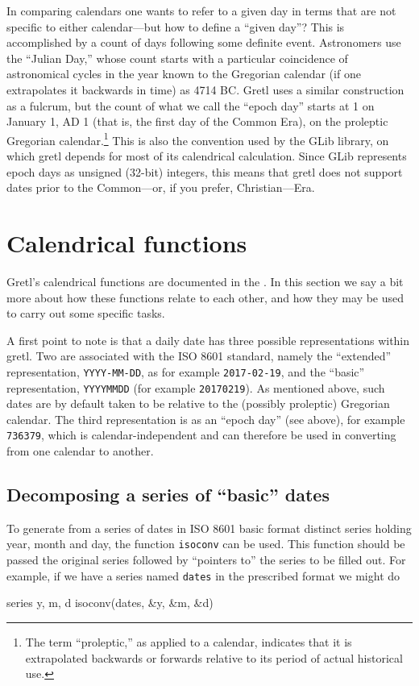 In comparing calendars one wants to refer to a given day in terms that
are not specific to either calendar---but how to define a ``given
day''? This is accomplished by a count of days following some definite
event. Astronomers use the ``Julian Day,'' whose count starts with a
particular coincidence of astronomical cycles in the year known to the
Gregorian calendar (if one extrapolates it backwards in time) as 4714
BC. Gretl uses a similar construction as a fulcrum, but the count of
what we call the ``epoch day'' starts at 1 on January 1, AD 1 (that
is, the first day of the Common Era), on the proleptic Gregorian
calendar.\footnote{The term ``proleptic,'' as applied to a calendar,
  indicates that it is extrapolated backwards or forwards relative to
  its period of actual historical use.} This is also the convention
used by the \textsf{GLib} library, on which gretl depends for most of
its calendrical calculation. Since \textsf{GLib} represents epoch days
as unsigned (32-bit) integers, this means that gretl does not support
dates prior to the Common---or, if you prefer, Christian---Era.

\section{Calendrical functions}
\label{cal-functions}

Gretl's calendrical functions are documented in the \GCR{}. In this
section we say a bit more about how these functions relate to each
other, and how they may be used to carry out some specific tasks.

A first point to note is that a daily date has three possible
representations within gretl. Two are associated with the ISO 8601
standard, namely the ``extended'' representation, \texttt{YYYY-MM-DD},
as for example \texttt{2017-02-19}, and the ``basic'' representation,
\texttt{YYYYMMDD} (for example \texttt{20170219}). As mentioned above,
such dates are by default taken to be relative to the (possibly
proleptic) Gregorian calendar. The third representation is as an
``epoch day'' (see above), for example \texttt{736379}, which is
calendar-independent and can therefore be used in converting from one
calendar to another.

\subsection{Decomposing a series of ``basic'' dates}

To generate from a series of dates in ISO 8601 basic format distinct
series holding year, month and day, the function \texttt{isoconv} can
be used. This function should be passed the original series followed
by ``pointers to'' the series to be filled out. For example, if we
have a series named \texttt{dates} in the prescribed format we might
do
%
\begin{code}
series y, m, d
isoconv(dates, &y, &m, &d)
\end{code}

